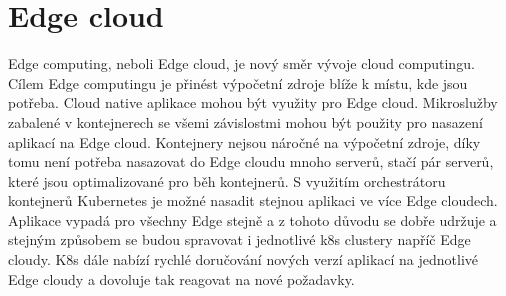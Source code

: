 \section{Edge cloud}
 Edge computing, neboli Edge cloud, je nový směr vývoje cloud computingu. Cílem Edge computingu je přinést výpočetní zdroje blíže k místu, kde jsou potřeba. Cloud native aplikace mohou být využity pro Edge cloud. Mikroslužby zabalené v kontejnerech se všemi závislostmi mohou být použity pro nasazení aplikací na Edge cloud. Kontejnery nejsou náročné na výpočetní zdroje, díky tomu není potřeba nasazovat do Edge cloudu mnoho serverů, stačí pár serverů, které jsou optimalizované pro běh \linebreak kontejnerů. S využitím orchestrátoru kontejnerů Kubernetes je možné nasadit stejnou aplikaci ve více Edge cloudech. Aplikace vypadá pro všechny Edge stejně a z tohoto důvodu se dobře udržuje a stejným způsobem se budou spravovat i jednotlivé k8s clustery napříč Edge cloudy. K8s dále nabízí rychlé doručování nových verzí aplikací \linebreak na jednotlivé Edge cloudy a dovoluje tak reagovat na nové požadavky.\par
